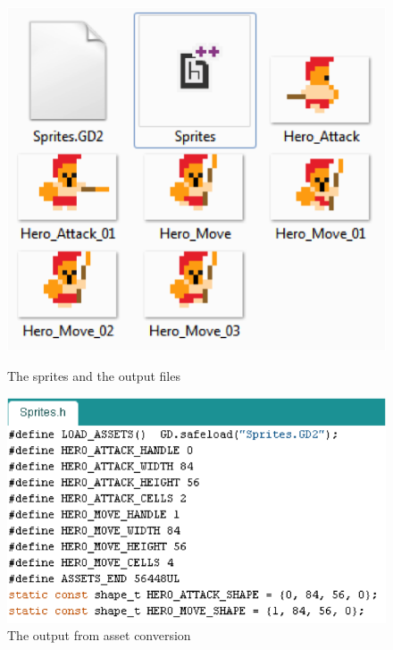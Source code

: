 \begin{figure}[h]
\begin{minipage}[b]{0.45\linewidth}
  \centering
  \includegraphics[scale=0.7]{Figures/Asset_output}
  \caption{The sprites and the output files}
  \label{fig:Asset_output}
\end{minipage}
\hspace{0.5cm}
\begin{minipage}[b]{0.45\linewidth}
  \centering
  \includegraphics[scale=0.7]{Figures/SpritesHeader}
  \caption{The output from asset conversion}
  \label{fig:SpritesHeader}
\end{minipage}
\end{figure}

